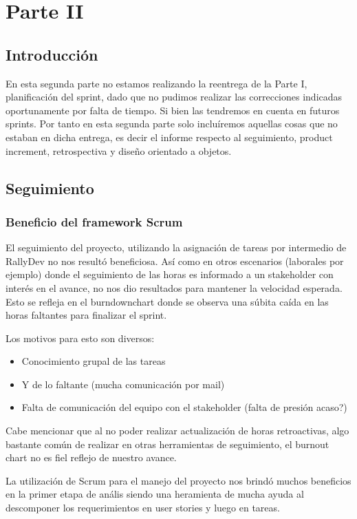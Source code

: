 \section{Parte II}
\subsection{Introducción}

En esta segunda parte no estamos realizando la reentrega de la Parte I, planificación del sprint, dado que no pudimos realizar las correcciones indicadas oportunamente por falta de tiempo. Si bien las tendremos en cuenta en futuros sprints. 
Por tanto en esta segunda parte solo incluíremos aquellas cosas que no estaban en dicha entrega, es decir el informe respecto al seguimiento, product increment, retrospectiva y diseño orientado a objetos. 

\subsection{Seguimiento}
\subsubsection{Beneficio del framework Scrum}

El seguimiento del proyecto, utilizando la asignaci\'on de tareas por intermedio de RallyDev no nos result\'o beneficiosa. As\'i como en otros escenarios (laborales por ejemplo) donde el seguimiento de las horas es informado a un stakeholder con inter\'es en el avance, no nos dio resultados para mantener la velocidad esperada. Esto se refleja en el burndownchart donde se observa una s\'ubita ca\'ida en las horas faltantes para finalizar el sprint.

Los motivos para esto son diversos:
\begin{itemize}
    \item Conocimiento grupal de las tareas 
    \item Y de lo faltante (mucha comunicaci\'on por mail)
    \item Falta de comunicaci\'on del equipo con el stakeholder (falta de presi\'on acaso?)
\end{itemize}

Cabe mencionar que al no poder realizar actualización de horas retroactivas, algo bastante común de realizar en otras herramientas de seguimiento, el burnout chart no es fiel reflejo de nuestro avance.

La utilizaci\'on de Scrum para el manejo del proyecto nos brindó muchos beneficios en la primer etapa de an\'alis siendo una heramienta de mucha ayuda al descomponer los requerimientos en user stories y luego en tareas.

